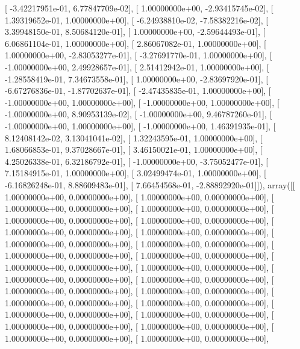 \documentclass{article}
\begin{document}
       [ -3.42217951e-01,   6.77847709e-02],
       [  1.00000000e+00,  -2.93415745e-02],
       [  1.39319652e-01,   1.00000000e+00],
       [ -6.24938810e-02,  -7.58382216e-02],
       [  3.39948150e-01,   8.50684120e-01],
       [  1.00000000e+00,  -2.59644493e-01],
       [  6.06861104e-01,   1.00000000e+00],
       [  2.86067082e-01,   1.00000000e+00],
       [  1.00000000e+00,  -2.83053277e-01],
       [ -3.27691770e-01,   1.00000000e+00],
       [ -1.00000000e+00,   2.49928657e-01],
       [  2.51412942e-01,   1.00000000e+00],
       [ -1.28558419e-01,   7.34673558e-01],
       [  1.00000000e+00,  -2.83697920e-01],
       [ -6.67276836e-01,  -1.87702637e-01],
       [ -2.47435835e-01,   1.00000000e+00],
       [ -1.00000000e+00,   1.00000000e+00],
       [ -1.00000000e+00,   1.00000000e+00],
       [ -1.00000000e+00,   8.90953139e-02],
       [ -1.00000000e+00,   9.46787260e-01],
       [ -1.00000000e+00,   1.00000000e+00],
       [ -1.00000000e+00,   1.46391935e-01],
       [  8.12408142e-02,   3.13041041e-02],
       [  1.32243595e-01,   1.00000000e+00],
       [  1.68066853e-01,   9.37028667e-01],
       [  3.46150021e-01,   1.00000000e+00],
       [  4.25026338e-01,   6.32186792e-01],
       [ -1.00000000e+00,  -3.75052477e-01],
       [  7.15184915e-01,   1.00000000e+00],
       [  3.02499474e-01,   1.00000000e+00],
       [ -6.16826248e-01,   8.88609483e-01],
       [  7.66454568e-01,  -2.88892920e-01]]), array([[  1.00000000e+00,   0.00000000e+00],
       [  1.00000000e+00,   0.00000000e+00],
       [  1.00000000e+00,   0.00000000e+00],
       [  1.00000000e+00,   0.00000000e+00],
       [  1.00000000e+00,   0.00000000e+00],
       [  1.00000000e+00,   0.00000000e+00],
       [  1.00000000e+00,   0.00000000e+00],
       [  1.00000000e+00,   0.00000000e+00],
       [  1.00000000e+00,   0.00000000e+00],
       [  1.00000000e+00,   0.00000000e+00],
       [  1.00000000e+00,   0.00000000e+00],
       [  1.00000000e+00,   0.00000000e+00],
       [  1.00000000e+00,   0.00000000e+00],
       [  1.00000000e+00,   0.00000000e+00],
       [  1.00000000e+00,   0.00000000e+00],
       [  1.00000000e+00,   0.00000000e+00],
       [  1.00000000e+00,   0.00000000e+00],
       [  1.00000000e+00,   0.00000000e+00],
       [  1.00000000e+00,   0.00000000e+00],
       [  1.00000000e+00,   0.00000000e+00],
       [  1.00000000e+00,   0.00000000e+00],
       [  1.00000000e+00,   0.00000000e+00],
       [  1.00000000e+00,   0.00000000e+00],
       [  1.00000000e+00,   0.00000000e+00],
       [  1.00000000e+00,   0.00000000e+00],
       [  1.00000000e+00,   0.00000000e+00],
\end{document}

